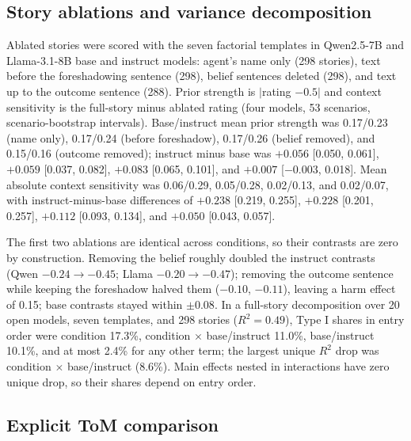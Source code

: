\subsection{Story ablations and variance decomposition}
\label{sec:supp-ablation}

Ablated stories were scored with the seven factorial templates in Qwen2.5-7B and Llama-3.1-8B base and instruct models: agent's name only (298 stories), text before the foreshadowing sentence (298), belief sentences deleted (298), and text up to the outcome sentence (288).
Prior strength is $|$rating $-0.5|$ and context sensitivity is the full-story minus ablated rating (four models, 53 scenarios, scenario-bootstrap intervals).
Base/instruct mean prior strength was 0.17/0.23 (name only), 0.17/0.24 (before foreshadow), 0.17/0.26 (belief removed), and 0.15/0.16 (outcome removed); instruct minus base was $+0.056$ [0.050, 0.061], $+0.059$ [0.037, 0.082], $+0.083$ [0.065, 0.101], and $+0.007$ [$-0.003$, 0.018].
Mean absolute context sensitivity was 0.06/0.29, 0.05/0.28, 0.02/0.13, and 0.02/0.07, with instruct-minus-base differences of $+0.238$ [0.219, 0.255], $+0.228$ [0.201, 0.257], $+0.112$ [0.093, 0.134], and $+0.050$ [0.043, 0.057].


The first two ablations are identical across conditions, so their contrasts are zero by construction.
Removing the belief roughly doubled the instruct contrasts (Qwen $-0.24\rightarrow-0.45$; Llama $-0.20\rightarrow-0.47$); removing the outcome sentence while keeping the foreshadow halved them ($-0.10$, $-0.11$), leaving a harm effect of 0.15; base contrasts stayed within $\pm0.08$.
In a full-story decomposition over 20 open models, seven templates, and 298 stories ($R^2=0.49$), Type I shares in entry order were condition 17.3\%, condition $\times$ base/instruct 11.0\%, base/instruct 10.1\%, and at most 2.4\% for any other term; the largest unique $R^2$ drop was condition $\times$ base/instruct (8.6\%).
Main effects nested in interactions have zero unique drop, so their shares depend on entry order.

\subsection{Explicit ToM comparison}

